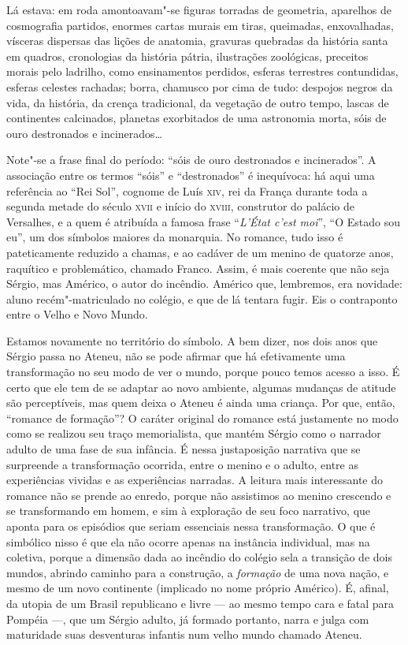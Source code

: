 \begin{hedraquote}
Lá estava: em roda amontoavam"-se figuras torradas de geometria,
aparelhos de cosmografia partidos, enormes cartas murais em tiras,
queimadas, enxovalhadas, vísceras dispersas das lições de anatomia,
gravuras quebradas da história santa em quadros, cronologias da
história pátria, ilustrações zoológicas, preceitos morais pelo
ladrilho, como ensinamentos perdidos, esferas terrestres contundidas,
esferas celestes rachadas; borra, chamusco por cima de tudo: despojos
negros da vida, da história, da crença tradicional, da vegetação de
outro tempo, lascas de continentes calcinados, planetas exorbitados de
uma astronomia morta, sóis de ouro destronados e incinerados\ldots{}
\end{hedraquote}


Note"-se a frase final do período: ``sóis de ouro destronados e
incinerados''. A associação entre os termos ``sóis'' e ``destronados'' é
inequívoca: há aqui uma referência ao ``Rei Sol'', cognome de Luís \textsc{xiv},
rei da França durante toda a segunda metade do século \textsc{xvii} e início do
\textsc{xviii}, construtor do palácio de Versalhes, e a quem é atribuída a
famosa frase ``\textit{L'État c'est moi}'', ``O Estado sou eu'', um dos símbolos
maiores da monarquia. No romance, tudo isso é pateticamente reduzido a chamas,
e ao cadáver de um menino de quatorze anos, raquítico e problemático,
chamado Franco. Assim, é mais coerente que não seja Sérgio, mas
Américo, o autor do incêndio. Américo que, lembremos, era novidade:
aluno recém"-matriculado no colégio, e que de lá tentara fugir. Eis o
contraponto entre o Velho e Novo Mundo.

Estamos novamente no território do símbolo. A bem dizer,
nos dois anos que Sérgio passa no Ateneu, não se pode afirmar que há
efetivamente uma transformação no seu modo de ver o mundo, porque pouco
temos acesso a isso. É certo que ele tem de se adaptar ao novo
ambiente, algumas mudanças de atitude são perceptíveis, mas quem deixa
o Ateneu é ainda uma criança. Por que, então, ``romance de formação''? O
caráter original do romance está justamente no modo como se realizou
seu traço memorialista, que mantém Sérgio como o narrador adulto de uma
fase de sua infância. É nessa justaposição narrativa que se surpreende
a transformação ocorrida, entre o menino e o adulto, entre as
experiências vividas e as experiências narradas. A leitura mais
interessante do romance não se prende ao enredo, porque não assistimos
ao menino crescendo e se transformando em homem, e sim à exploração de
seu foco narrativo, que aponta para os episódios que seriam essenciais
nessa transformação. O que é simbólico nisso é que ela não ocorre
apenas na instância individual, mas na coletiva, porque a dimensão dada
ao incêndio do colégio sela a transição de dois mundos, abrindo caminho
para a construção, a \textit{formação} de
uma nova nação, e mesmo de um novo continente (implicado no nome
próprio Américo). É, afinal, da utopia de um Brasil republicano e livre --- ao
mesmo tempo cara e fatal para Pompéia ---, que um Sérgio adulto, já
formado portanto, narra e julga com maturidade suas desventuras
infantis num velho mundo chamado Ateneu. 
